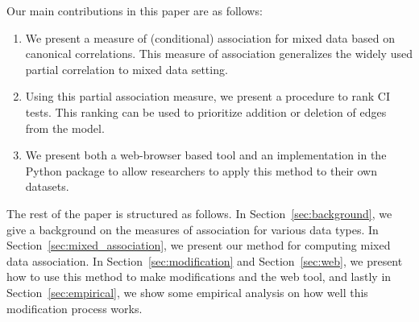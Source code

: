 \documentclass{uai2025} %
\def\ci{\perp\!\!\!\!\!\perp}
\begin{document}

Our main contributions in this paper are as follows:
\begin{enumerate}
	\item We present a measure of (conditional) association for mixed data
		based on canonical correlations. This measure of association
		generalizes the widely used partial correlation to mixed data
		setting.
	\item Using this partial association measure, we present a procedure to
		rank CI tests. This ranking can be used to prioritize addition
		or deletion of edges from the model.
	\item We present both a web-browser based tool and an implementation in
		the Python package to allow researchers to apply this method to
		their own datasets.
\end{enumerate}

The rest of the paper is structured as follows. In
Section~\ref{sec:background}, we give a background on the measures of
association for various data types. In Section~\ref{sec:mixed_association}, we
present our method for computing mixed data association. In
Section~\ref{sec:modification} and Section~\ref{sec:web}, we present how to use
this method to make modifications and the web tool, and lastly in
Section~\ref{sec:empirical}, we show some empirical analysis on how well this
modification process works.
\end{document}
